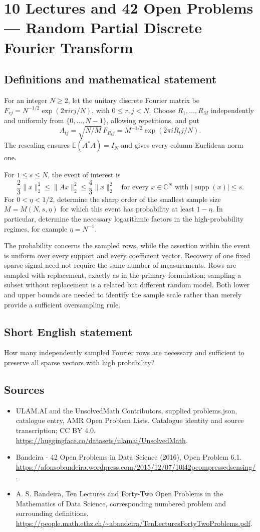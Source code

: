 \documentclass[11pt,a4paper]{article}
\begin{document}
\section*{10 Lectures and 42 Open Problems — Random Partial Discrete Fourier Transform}\label{statement}

\subsection{Definitions and mathematical statement}
For an integer $N\ge2$, let the unitary discrete Fourier matrix be
$F_{rj}=N^{-1/2}\exp(2\pi i rj/N)$, with $0\le r,j<N$.
Choose $R_1,\ldots,R_M$ independently and uniformly from
$\{0,\ldots,N-1\}$, allowing repetitions, and put
\[
 A_{tj}=\sqrt{N/M}\,F_{R_tj}
       =M^{-1/2}\exp(2\pi i R_tj/N).
\]
The rescaling ensures $\mathbb E(A^*A)=I_N$ and gives every column
Euclidean norm one.

For $1\le s\le N$, the event of interest is
\[
 \frac23\|x\|_2^2\le\|Ax\|_2^2\le\frac43\|x\|_2^2
 \quad\text{for every }x\in\mathbb C^N
       \text{ with }|\operatorname{supp}(x)|\le s.
\]
For $0<\eta<1/2$, determine the sharp order of the smallest sample
size $M=M(N,s,\eta)$ for which this event has probability at least
$1-\eta$. In particular, determine the necessary logarithmic factors
in the high-probability regimes, for example $\eta=N^{-1}$.

The probability concerns the sampled rows, while the assertion within
the event is uniform over every support and every coefficient vector.
Recovery of one fixed sparse signal need not require the same number
of measurements. Rows are sampled with replacement, exactly as in
the primary formulation; sampling a subset without replacement is a
related but different random model. Both lower and upper bounds are
needed to identify the sample scale rather than merely provide a
sufficient oversampling rule.
\subsection{Short English statement}
How many independently sampled Fourier rows are necessary and sufficient to preserve all sparse vectors with high probability?
\subsection{Sources}
\begin{itemize}
\item[S1] ULAM.AI and the UnsolvedMath Contributors, supplied problems.json, catalogue entry, AMR Open Problem Lists. Catalogue identity and source transcription; CC BY 4.0.
\url{https://huggingface.co/datasets/ulamai/UnsolvedMath}.
\item[S2] Bandeira - 42 Open Problems in Data Science (2016), Open Problem 6.1. 
\url{https://afonsobandeira.wordpress.com/2015/12/07/10l42pcompressedsensing/}.
\item[S3] A. S. Bandeira, Ten Lectures and Forty-Two Open Problems in the Mathematics of Data Science, corresponding numbered problem and surrounding definitions.
\url{https://people.math.ethz.ch/~abandeira/TenLecturesFortyTwoProblems.pdf}.
\end{itemize}
\end{document}
